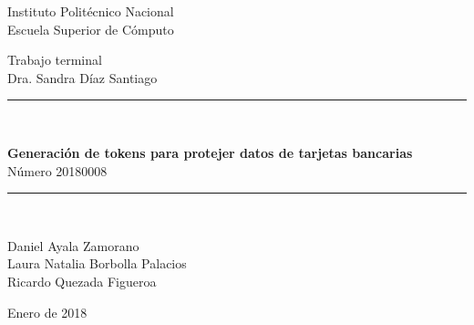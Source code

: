 \documentclass[10pt, letterpaper, oneside]{book}
\newcommand{\Titulo}{Generación de tokens para protejer
                     datos de tarjetas bancarias}
\newcommand{\Subtitulo}{Número 20180008}
\newcommand{\Director}{Dra. Sandra Díaz Santiago}
\newcommand{\Autor}{Daniel Ayala Zamorano \\
                    Laura Natalia Borbolla Palacios \\
                    Ricardo Quezada Figueroa}
\newcommand{\Fecha}{Enero de 2018}
\begin{document}
  \begin{titlepage}
    \begin{center}
      \begin{large}
        Instituto Politécnico Nacional\\
        \vspace*{0.2in}
        Escuela Superior de Cómputo\\
        \vspace*{1.0in}
      \end{large}
      \begin{large}
        Trabajo terminal\\
        \vspace*{0.2in}
        \Director{}\\
        \vspace*{1.0in}
      \end{large}
      \rule{7in}{0.5pt}\\
      \vspace*{0.1in}
      \begin{Large}
        \textbf{\Titulo{}} \\
        \vspace*{0.1in}
        \Subtitulo{} \\
      \end{Large}
      \vspace*{0.1in}
      \rule{7in}{0.5pt}\\
      \begin{large}
        \vspace*{1.0in}
        \Autor{} \\
      \end{large}
      \begin{large}
        \vspace*{1.0in}
        \Fecha{}\\
      \end{large}
    \end{center}
  \end{titlepage}

  \tableofcontents
  \newpage
  
  
\end{document}

